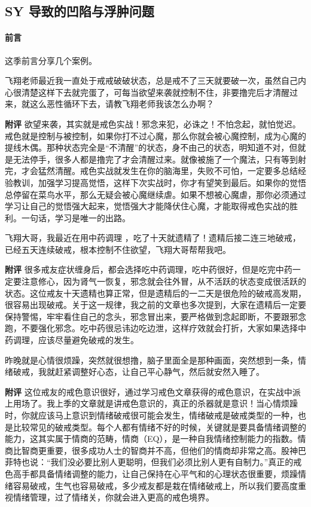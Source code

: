 \subsection{SY 导致的凹陷与浮肿问题}

\paragraph*{前言}

这季前言分享几个案例。

\begin{case}
    飞翔老师最近我一直处于戒戒破破状态，总是戒不了三天就要破一次，虽然自己内心很清楚这样下去就完蛋了，可每当欲望来袭就控制不住，非要撸完后才清醒过来，就这么恶性循环下去，请教飞翔老师我该怎么办啊？

    \textbf{附评} 欲望来袭，其实就是戒色实战！邪念来犯，必诛之！不怕念起，就怕觉迟。戒色就是控制与被控制，如果你打不过心魔，那么你就会被心魔控制，成为心魔的提线木偶。那种状态完全是“不清醒”的状态，身不由己的状态，明知道不对，但就是无法停手，很多人都是撸完了才会清醒过来。就像被施了一个魔法，只有等到射完，才会猛然清醒。戒色实战就发生在你的脑海里，失败不可怕，一定要多总结经验教训，加强学习提高觉悟，这样下次实战时，你才有望笑到最后。如果你的觉悟总停留在菜鸟水平，那么无疑会被心魔继续虐。如果不想被心魔虐，那你必须通过学习让自己的觉悟强大起来，觉悟强大才能降伏住心魔，才能取得戒色实战的胜利。一句话，学习是唯一的出路。
\end{case}

\begin{case}
    飞翔大哥，我最近在用中药调理 ，吃了十天就遗精了！遗精后接二连三地破戒，已经五天连续破戒，根本控制不住欲望，飞翔大哥帮帮我吧。

    \textbf{附评} 很多戒友症状缠身后，都会选择吃中药调理，吃中药很好，但是吃完中药一定要注意修心，因为肾气一恢复，邪念就会往外冒，从不活跃的状态变成很活跃的状态。这位戒友十天遗精也算正常，但是遗精后的一二天是很危险的破戒高发期，很容易出现破戒。关于这一规律，我之前的文章也多次提到，大家在遗精后一定要保持警惕，牢牢看住自己的念头，邪念冒出来，要严格做到念起即断，不要跟邪念跑，不要强化邪念。吃中药很忌讳边吃边泄，这样疗效就会打折，大家如果选择中药调理，应该尽量避免破戒的发生。
\end{case}

\begin{case}
    昨晚就是心情很烦躁，突然就很想撸，脑子里面全是那种画面，突然想到一条，情绪破戒，我就赶紧调整好心态，让自己平心静气，然后就安然入睡了。

    \textbf{附评} 这位戒友的戒色意识很好，通过学习戒色文章获得的戒色意识，在实战中派上用场了。我上季的文章就是讲戒色意识的，真正的杀器就是意识！当心情烦躁时，你就应该马上意识到情绪破戒很可能会发生，情绪破戒是破戒类型的一种，也是比较常见的破戒类型。每个人都有情绪不好的时候，关键就是要具备情绪调整的能力，这其实属于情商的范畴，情商（EQ），是一种自我情绪控制能力的指数。情商比智商更重要，很多成功人士的智商并不高，但他们的情商却非常之高。股神巴菲特也说：“我们没必要比别人更聪明，但我们必须比别人更有自制力。”真正的戒色高手都具备情绪调整的能力，让自己保持在心平气和的心理状态很重要，烦躁情绪容易破戒，生气也容易破戒，多少戒友都是栽在情绪破戒上，所以我们要高度重视情绪管理，过了情绪关，你就会进入更高的戒色境界。
\end{case}

